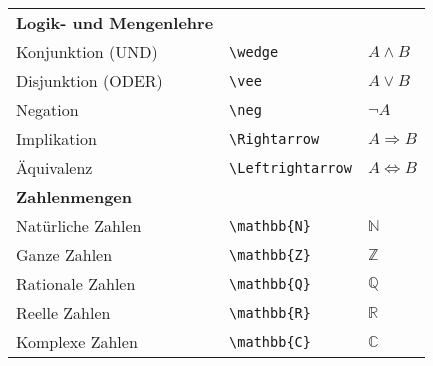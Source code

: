 \begin{table}[H]
\begin{longtable}{>{\raggedright}p{4cm} >{\raggedright}p{6cm} >{\raggedright}p{5cm}}
        \textbf{Logik- und Mengenlehre}                      &                                                                                         &                                      \\
        Konjunktion (UND)                                    & \texttt{\textbackslash wedge}                                                           & $ A \wedge B $                       \\
        Disjunktion (ODER)                                   & \texttt{\textbackslash vee}                                                             & $ A \vee B $                         \\
        Negation                                             & \texttt{\textbackslash neg}                                                             & $ \neg A $                           \\
        Implikation                                          & \texttt{\textbackslash Rightarrow}                                                      & $ A \Rightarrow B $                  \\
        Äquivalenz                                           & \texttt{\textbackslash Leftrightarrow}                                                  & $ A \Leftrightarrow B $              \\

        \textbf{Zahlenmengen}                                &                                                                                         &                                      \\
        Natürliche Zahlen                                    & \texttt{\textbackslash mathbb\{N\}}                                                     & \( \mathbb{N} \)                     \\
        Ganze Zahlen                                         & \texttt{\textbackslash mathbb\{Z\}}                                                     & \( \mathbb{Z} \)                     \\
        Rationale Zahlen                                     & \texttt{\textbackslash mathbb\{Q\}}                                                     & \( \mathbb{Q} \)                     \\
        Reelle Zahlen                                        & \texttt{\textbackslash mathbb\{R\}}                                                     & \( \mathbb{R} \)                     \\
        Komplexe Zahlen                                      & \texttt{\textbackslash mathbb\{C\}}                                                     & \( \mathbb{C} \)                     \\


\end{longtable}
\end{table}
